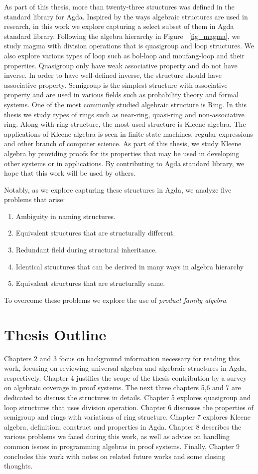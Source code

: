 As part of this thesis, more than twenty-three structures was defined in the
standard library for Agda. Inspired by the ways algebraic structures are used in
research, in this work we explore capturing a select subset of them in Agda
standard library. Following the algebra hierarchy in Figure ~\ref{fig_magma}, we
study magma with division operations that is quasigroup and loop structures. We
also explore various types of loop such as bol-loop and moufang-loop and their
properties. Quasigroup only have weak associative property and do not have
inverse. In order to have well-defined inverse, the structure should have
associative property. Semigroup is the simplest structure with associative
property and are used in various fields such as probability theory and formal
systems. One of the most commonly studied algebraic structure is Ring. In this
thesis we study types of rings such as near-ring, quasi-ring and non-associative
ring. Along with ring structure, the most used structure is Kleene algebra. The
applications of Kleene algebra is seen in finite state machines, regular
expressions and other branch of computer science. As part of this thesis, we
study Kleene algebra by providing proofs for its properties that may be used in
developing other systems or in applications. By contributing to Agda standard
library, we hope that this work will be used by others. 

Notably, as we explore capturing these structures in Agda, we analyze five problems that arise:
\begin{enumerate}
\item Ambiguity in naming structures.
\item Equivalent structures that are structurally different.
\item Redundant field during structural inheritance.
\item Identical structures that can be derived in many ways in algebra hierarchy
\item Equivalent structures that are structurally same.
\end{enumerate}
To overcome these problems we explore the use of \textit{product family
algebra}.

\section{Thesis Outline}
Chapters 2 and 3 focus on background information necessary for reading this
work, focusing on reviewing universal algebra and algebraic structures in Agda,
respectively. Chapter 4 justifies the scope of the thesis contribution by a
survey on algebraic coverage in proof systems. The next three chapters 5,6 and 7
are dedicated to discuss the structures in details. Chapter 5 explores
quasigroup and loop structures that uses division operation. Chapter 6 discusses
the properties of semigroup and rings with variations of ring structure. Chapter
7 explores Kleene algebra, definition, construct and properties in Agda. Chapter
8 describes the various problems we faced during this work, as well as advice on
handling common issues in programming algebras in proof systems. Finally,
Chapter 9 concludes this work with notes on related future works and some
closing thoughts.
